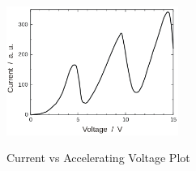 		\begin{figure}[h!]
			\centering
			\includegraphics[width=0.5\textwidth]{images/fh_theo_plot.png}
			\label{fig: fh}
			\caption{Current vs Accelerating Voltage Plot}
		\end{figure}
		
